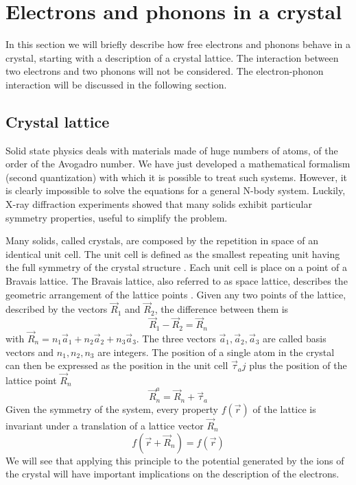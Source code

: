 \section{Electrons and phonons in a crystal}
In this section we will briefly describe how free electrons and phonons behave in a crystal, starting with a description of a crystal lattice. The interaction between two electrons and two phonons will not be considered. The electron-phonon interaction will be discussed in the following section.
\subsection{Crystal lattice}
Solid state physics deals with materials made of huge numbers of atoms, of the order of the Avogadro number. We have just developed a mathematical formalism (second quantization) with which it is possible to treat such systems. However, it is clearly impossible to solve the equations for a general N-body system. Luckily, X-ray diffraction experiments showed that many solids exhibit particular symmetry properties, useful to simplify the problem.

Many solids, called crystals, are composed by the repetition in space of an identical unit cell. The unit cell is defined as the smallest repeating unit having the full symmetry of the crystal structure \cite{westBasicSolidState1999}.
Each unit cell is place on a point of a Bravais lattice. The Bravais lattice, also referred to as space lattice, describes the geometric arrangement of the lattice points \cite{lernerEncyclopediaPhysicsVolumes2005}. Given any two points of the lattice, described by the vectors $\vec{R}_1$ and $\vec{R}_2$, the difference between them is
\begin{equation}
    \vec{R}_1 - \vec{R}_2 = \vec{R}_n
\end{equation}
with $\vec{R}_n = n_1\vec{a}_1 + n_2\vec{a}_2 + n_3\vec{a}_3$. The three vectors $\vec{a}_1, \vec{a}_2, \vec{a}_3$ are called basis vectors and $n_1, n_2, n_3$ are integers. The position of a single atom in the crystal can then be expressed as the position in the unit cell $\vec{\tau}_aj$ plus the position of the lattice point $\vec{R}_n$
\begin{equation}
    \vec{R}_n^a = \vec{R}_n + \vec{\tau}_a
\end{equation}
Given the symmetry of the system, every property $f(\vec{r})$ of the lattice is invariant under a translation of a lattice vector $\vec{R}_n$
\begin{equation} \label{eq:translational_invariance}
    f(\vec{r}+\vec{R}_n) = f(\vec{r})
\end{equation}
We will see that applying this principle to the potential generated by the ions of the crystal will have important implications on the description of the electrons.

